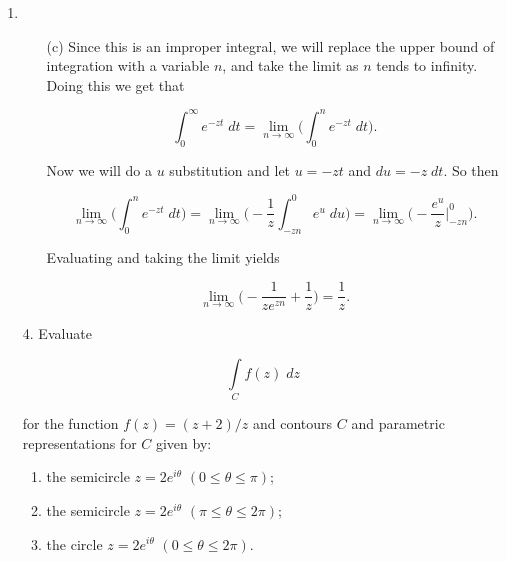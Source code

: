 \documentclass[12pt]{article}
\makeatletter
\theoremstyle{definition}
\theoremstyle{remark}
\newenvironment{solution}[1][\bf{\textit{Solution}}]{\par
  
  \normalfont \topsep6\p@\@plus6\p@\relax
  \list{}{\leftmargin=0mm
          \rightmargin=0mm
          \settowidth{\itemindent}{\itshape#1}%
          \labelwidth=\itemindent
          \parsep=0pt \listparindent=\parindent 
  }
  \item[\hskip\labelsep
        \itshape
    #1\@addpunct{.}]\ignorespaces
}{%
  \popQED\endlist\@endpefalse
}
\makeatother
\begin{document}
\begin{enumerate}[leftmargin=*]
\begin{solution}
\begin{enumerate}[label=(\alph*)]
            \item[(c)] Since this is an improper integral, we will replace the upper bound of integration with a variable $n$, and take the limit as $n$ tends to infinity. Doing this we get that
            
            \begin{equation*}
                \int_{0}^{\infty}e^{-zt}\;dt = \lim_{n\rightarrow\infty}\bigg(\int_{0}^{n}e^{-zt}\;dt\bigg).
            \end{equation*}
            
            \noindent Now we will do a $u$ substitution and let $u=-zt$ and $du=-z\;dt$. So then 
            
            \begin{equation*}
                \lim_{n\rightarrow\infty}\bigg(\int_{0}^{n}e^{-zt}\;dt\bigg) = \lim_{n\rightarrow\infty}\bigg(-\frac{1}{z}\int_{-zn}^{0}e^u\;du\bigg)=\lim_{n\rightarrow\infty}\bigg(-\frac{e^u}{z}\bigg\rvert_{-zn}^{0}\bigg).
            \end{equation*}
            
            \noindent Evaluating and taking the limit yields
            
            \begin{equation*}
                \lim_{n\rightarrow\infty}\bigg(-\frac{1}{ze^{zn}}+\frac{1}{z}\bigg) =\frac{1}{z}.
            \end{equation*}
            
            \newpage
            
        \end{enumerate}
        
    \end{solution}
    
    \item[4.] Evaluate
    
    \begin{equation*}
        \int\limits_{C} f(z)\;dz
    \end{equation*}
    
    \noindent for the function $f(z)=(z+2)/z$ and contours $C$ and parametric representations for $C$ given by:
    
    \begin{enumerate}[label=(\alph*)]
        \item the semicircle $z=2e^{i\theta}$ $(0\leq\theta\leq\pi)$;
        \item the semicircle $z=2e^{i\theta}$ $(\pi\leq\theta\leq 2\pi)$;
        \item the circle $z=2e^{i\theta}$ $(0\leq\theta\leq 2\pi)$.
    \end{enumerate}
    

\end{enumerate}
\end{document}
